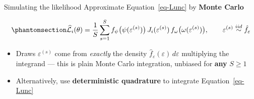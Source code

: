 \documentclass[
  ignorenonframetext,
  aspectratio=169,
]{beamer}
\providecommand{\tightlist}{%
  \setlength{\itemsep}{0pt}\setlength{\parskip}{0pt}}
\begin{document}
\begin{frame}{Simulating the likelihood}
\protect{}\label{simulating-the-likelihood}
Approximate Equation~\ref{eq-Lunc} by \textbf{Monte Carlo}

\begin{equation}\protect\phantomsection\label{eq-msl-sim}{
\widehat{\mathcal L}_i(\theta)=\frac1S\sum_{s=1}^S f_\psi\big(\psi(\varepsilon^{(s)})\big)\,J_i(\varepsilon^{(s)})\,f_\omega\big(\omega(\varepsilon^{(s)})\big),\qquad \varepsilon^{(s)}\overset{iid}\sim \hat f_\varepsilon
}\end{equation}

\begin{itemize}
\tightlist
\item
  Draws \(\varepsilon^{(s)}\) come from \emph{exactly} the density
  \(\hat f_\varepsilon(\varepsilon)\,d\varepsilon\) multiplying the
  integrand --- this is plain Monte Carlo integration, unbiased for
  \textbf{any} \(S\ge1\)
\item
  Alternatively, use \textbf{deterministic quadrature} to integrate
  Equation~\ref{eq-Lunc}
\end{itemize}
\end{frame}
\end{document}
